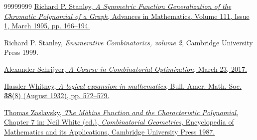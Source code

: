 \documentclass[numbers=enddot,12pt,final,onecolumn,notitlepage]{scrartcl}%
\theoremstyle{definition}
\begin{document}
\begin{thebibliography}{99999999}
%
\href{https://doi.org/10.1006/aima.1995.1020}{Richard P. Stanley, \textit{A
Symmetric Function Generalization of the Chromatic Polynomial of a Graph},
Advances in Mathematics, Volume 111, Issue 1, March 1995, pp. 166--194.}

Richard P. Stanley, \textit{Enumerative
Combinatorics, volume 2}, Cambridge University Press 1999.

%
\href{http://homepages.cwi.nl/~lex/files/dict.pdf}{Alexander Schrijver,
\textit{A Course in Combinatorial Optimization}, March 23, 2017.}

%
\href{https://projecteuclid.org/journals/bulletin-of-the-american-mathematical-society/volume-38/issue-8/A-logical-expansion-in-mathematics/bams/1183496087.full}{Hassler
Whitney, \textit{A logical expansion in mathematics}, Bull. Amer. Math. Soc.
\textbf{38}(8) (August 1932), pp. 572--579.}

%
\href{https://people.math.binghamton.edu/zaslav/Tpapers/muchapter.pdf}{Thomas
Zaslavsky, \textit{The M\"{o}bius Function and the Characteristic Polynomial},
Chapter 7 in: Neil White (ed.), \textit{Combinatorial Geometries},
Encyclopedia of Mathematics and its Applications, Cambridge University Press
1987.}
\end{thebibliography}
\end{document}
